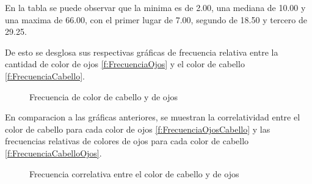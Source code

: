 \documentclass[12pt,a4paper]{article}
\begin{document}
En la tabla se puede observar que la minima es de 2.00, una mediana de 10.00 y una maxima de 66.00, con el primer lugar de 7.00, segundo de 18.50 y tercero de 29.25.

De esto se desglosa  sus respectivas gráficas de frecuencia relativa entre la cantidad de color de ojos \ref{f:FrecuenciaOjos} y el color  de cabello  \ref{f:FrecuenciaCabello}.



\begin{figure}
 \centering
 \caption{Frecuencia de color de cabello y de ojos}
 \label{f:Frecuencias}
\end{figure}

\newpage


En comparacion a las gráficas anteriores, se muestran la correlatividad entre el color de cabello para cada color de ojos \ref{f:FrecuenciaOjosCabello} y las frecuencias relativas de colores de ojos para cada color de cabello \ref{f:FrecuenciaCabelloOjos}.


\begin{figure}[h]
 \centering
 \caption{Frecuencia correlativa entre el color de cabello y de ojos}
 \label{f:Frecuencias2}
\end{figure}
\end{document}
